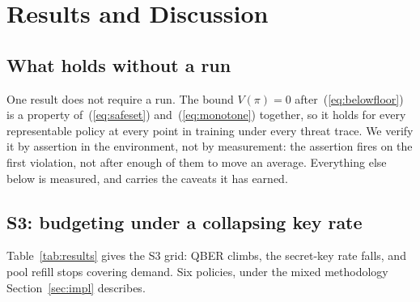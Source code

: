\documentclass[conference]{IEEEtran}
\begin{document}
\section{Results and Discussion}
\label{sec:results}

\subsection{What holds without a run}

One result does not require a run. The bound $V(\pi) = 0$
after~(\ref{eq:belowfloor}) is a property of~(\ref{eq:safeset}) and~(\ref{eq:monotone}) together, so it holds
for every representable policy at every point in training under
every threat trace. We verify it by assertion in the environment,
not by measurement: the assertion fires on the first violation,
not after enough of them to move an average. Everything else
below is measured, and carries the caveats it has earned.

\subsection{S3: budgeting under a collapsing key rate}

Table~\ref{tab:results} gives the S3 grid: QBER climbs, the secret-key rate
falls, and pool refill stops covering demand. Six policies, under
the mixed methodology Section~\ref{sec:impl} describes.
\end{document}
